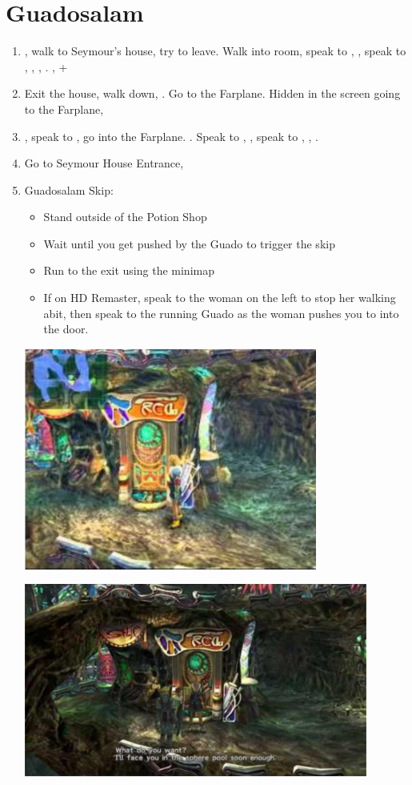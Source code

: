 \chapter{Guadosalam}

\begin{enumerate}
  \item \sd, walk to Seymour's house, try to leave. Walk into room, speak to \auron, \sd, speak to \lulu, \wakka, \rikku, \yuna. \sd, \fmv+\cs[5:50]
  \item Exit the house, walk down, \sd. Go to the Farplane. Hidden in the screen going to the Farplane, 
  \item \sd, speak to \auron, go into the Farplane. \cs[1:20]. Speak to \wakka, \sd, speak to \yuna, \cs[2:10], \sd.
  \item Go to Seymour House Entrance, \sd
  \item Guadosalam Skip:
        \begin{itemize}
          \item Stand outside of the Potion Shop
          \item Wait until you get pushed by the Guado to trigger the skip
          \item Run to the exit using the minimap
          \item If on HD Remaster, speak to the woman on the left to stop her walking abit, then speak to the running Guado as the woman pushes you to into the door.
        \end{itemize}
        \includegraphics{graphics/guadoskipstandard}

        \includegraphics{graphics/guadoskipremaster}
\end{enumerate}